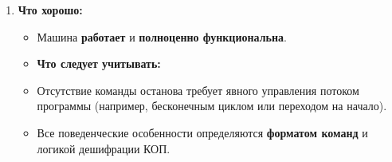 \documentclass[12px]{article}
\begin{document}
\begin{enumerate}
\begin{enumerate}
\begin{itemize}
\begin{enumerate}
      \item \textbf{Условный переход} \\
      Команда содержит \textbf{два поля}:\\
      \textbf{A}~--- адрес перехода,\\
	\textbf{B}~--- \textbf{маска} (шаблон значений регистра признаков результата).

\end{enumerate}
      Процесс:
      \begin{enumerate}
        \item Маска передаётся на схему сравнения.
        \item В схеме сравниваются текущие значения \textbf{флагов} (признаков результата) с маской.
        \item \textbf{Если совпадение есть}~--- адрес A загружается в счётчик команд.
        \item \textbf{Если совпадения нет}~--- счётчик команд инкрементируется на 1 (как при линейной команде), и выполнение продолжается со следующей команды.
      \end{enumerate}
	\end{itemize}
    \end{enumerate}


    \item \textbf{Что хорошо:}
      \begin{itemize}
        \item Машина \textbf{работает} и \textbf{полноценно функциональна}.

      \item \textbf{Что следует учитывать:}
      \item Отсутствие команды останова требует явного управления потоком программы (например, бесконечным циклом или переходом на начало).
        \item Все поведенческие особенности определяются \textbf{форматом команд} и логикой дешифрации КОП.
    \end{itemize}
  \end{enumerate}
\end{document}
